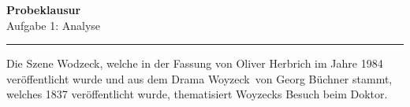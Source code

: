 \documentclass[a4paper,12pt]{report}
\begin{document}
	\noindent
	\Large
	\textbf{Probeklausur}
	\\
	Aufgabe 1: Analyse
	\hrule
	\vspace{0.5cm}
	\noindent
	\large
	Die Szene \dq Wodzeck\dq, welche in der Fassung von Oliver Herbrich im Jahre 1984 veröffentlicht wurde und aus dem Drama \dq Woyzeck\dq\ von Georg Büchner stammt, welches 1837 veröffentlicht wurde, thematisiert Woyzecks Besuch beim Doktor.
\end{document}
